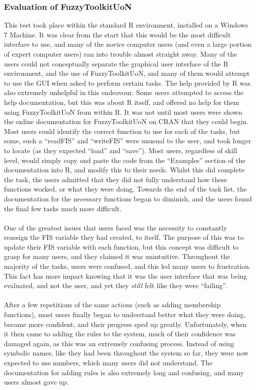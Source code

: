 \subsubsection{Evaluation of FuzzyToolkitUoN}
This test took place within the standard R environment, installed on a Windows 7 Machine. It was clear from the start that this would be the most difficult interface to use, and many of the novice computer users (and even a large portion of expert computer users) ran into trouble almost straight away. Many of the users could not conceptually separate the graphical user interface of the R environment, and the use of FuzzyToolkitUoN, and many of them would attempt to use the GUI when asked to perform certain tasks. The help provided by R was also extremely unhelpful in this endeavour. Some users attempted to access the help documentation, but this was about R itself, and offered no help for them using FuzzyToolkitUoN from within R. It was not until most users were shown the online documentation for FuzzyToolkitUoN on CRAN that they could begin. Most users could identify the correct function to use for each of the tasks, but some, such a ``readFIS'' and ``writeFIS'' were unusual to the user, and took longer to locate (as they expected ``load'' and ``save''). Most users, regardless of skill level, would simply copy and paste the code from the ``Examples'' section of the documentation into R, and modify this to their needs. Whilst this did complete the task, the users admitted that they did not fully understand how these functions worked, or what they were doing. Towards the end of the task list, the documentation for the necessary functions began to diminish, and the users found the final few tasks much more difficult.\ \\
\ \\
One of the greatest issues that users faced was the necessity to constantly reassign the FIS variable they had created, to itself. The purpose of this was to update their FIS variable with each function, but this concept was difficult to grasp for many users, and they claimed it was unintuitive. Throughout the majority of the tasks, users were confused, and this led many users to frustration. This fact has more impact knowing that it was the user interface that was being evaluated, and not the user, and yet they \emph{still} felt like they were ``failing''.\ \\
\ \\
After a few repetitions of the same actions (such as adding membership functions), most users finally began to understand better what they were doing, became more confident, and their progress sped up greatly. Unfortunately, when it then came to adding the rules to the system, much of their confidence was damaged again, as this was an extremely confusing process. Instead of using symbolic names, like they had been throughout the system so far, they were now expected to use numbers, which many users did not understand. The documentation for adding rules is also extremely long and confusing, and many users almost gave up.\ \\
